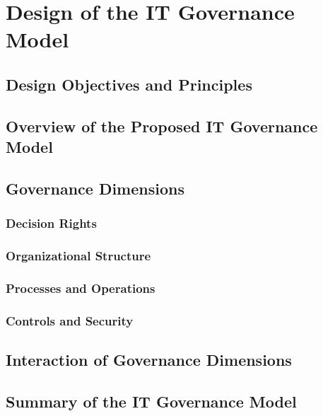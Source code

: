 \newpage
\section{Design of the IT Governance Model}
\label{sec:DesignOfTheITGovernanceModel}

\subsection{Design Objectives and Principles}
\label{subsec:DesignObjectivesAndPrinciples}

\subsection{Overview of the Proposed IT Governance Model}
\label{subsec:OverviewOfTheProposedITGovernanceModel}

\subsection{Governance Dimensions}
\label{subsec:GovernanceDimensions}

\subsubsection{Decision Rights}
\label{subsubsec:DecisionRights}

\subsubsection{Organizational Structure}
\label{subsubsec:OrganizationalStructure}

\subsubsection{Processes and Operations}
\label{subsubsec:ProcessesAndOperations}

\subsubsection{Controls and Security}
\label{subsubsec:ControlsAndSecurity}

\subsection{Interaction of Governance Dimensions}
\label{subsec:InteractionOfGovernanceDimensions}

\subsection{Summary of the IT Governance Model}
\label{subsec:SummaryOfTheITGovernanceModel}